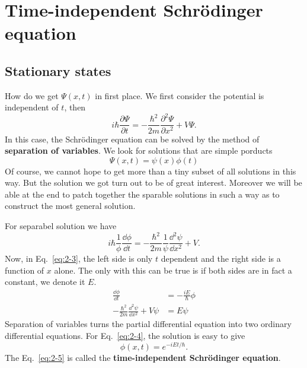 \chapter{Time-independent Schr\"odinger equation}

\section{Stationary states}
How do we get $\Psi \left( x,t \right)$ in first place.
We first consider the potential is independent of $t$, then
\begin{equation}
  \label{eq:2-1}
i \hbar \frac{\partial \Psi}{\partial t} = - \frac{\hbar^{2}}{2m} \frac{\partial^{2} \Psi}{\partial x^2} + V \Psi.
\end{equation}
In this case, the Schr\"odinger equation can be solved by the method of \textbf{separation of variables}.
We look for solutions that are simple porducts
\begin{equation}
  \label{eq:2-2}
  \Psi \left( x,t \right) = \psi \left( x \right) \phi \left( t \right)
\end{equation}
Of course, we cannot hope to get more than a tiny subset of all solutions in this way.
But the solution we got turn out to be of great interest.
Moreover we will be able at the end to patch together the sparable solutions in such a way as to construct the most general solution.

For separabel solution we have
\begin{equation}
  \label{eq:2-3}
  i\hbar \frac{1}{\phi} \frac{\dd \phi}{\dd t} = - \frac{\hbar^{2}}{2m} \frac{1}{\psi} \frac{\dd^{2} \psi}{\dd x^{2}} + V.
\end{equation}
Now, in Eq.~\eqref{eq:2-3}, the left side is only $t$ dependent and the right side is a function of $x$ alone.
The only with this can be true is if both sides are in fact a constant, we denote it $E$.
\begin{align}
  \label{eq:2-4}
  \frac{\dd \phi}{\dd t} &= - \frac{i E}{\hbar} \phi \\
  \label{eq:2-5}
  -\frac{\hbar^{2}}{2m} \frac{\dd^{2}\psi}{\dd x^{2}} + V\psi &= E\psi
\end{align}
Separation of variables turns the partial differential equation into two ordinary differential equations.
For Eq.~\eqref{eq:2-4}, the solution is easy to give
\begin{equation}
  \label{eq:2-6}
  \phi \left( x,t \right)  = e^{-i Et/\hbar}.
\end{equation}
The Eq.~\eqref{eq:2-5} is called the \textbf{time-independent Schr\"odinger equation}.

